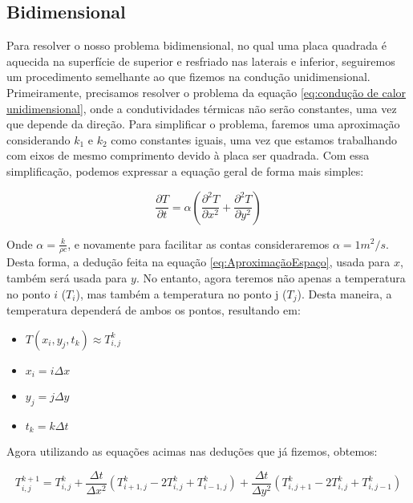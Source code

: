 \documentclass[final,5p,times,twocolumn]{elsarticle}
\begin{document}
\subsection{Bidimensional}


Para resolver o nosso problema bidimensional, no qual uma placa quadrada é aquecida na superfície de superior e resfriado nas laterais e inferior, seguiremos um procedimento semelhante ao que fizemos na condução unidimensional. Primeiramente, precisamos resolver o problema da equação \ref{eq:condução de calor unidimensional}, onde a condutividades térmicas não serão constantes, uma vez que depende da direção. Para simplificar o problema, faremos uma aproximação considerando $k_1$ e $k_2$ como constantes iguais, uma vez que estamos trabalhando com eixos de mesmo comprimento devido à placa ser quadrada. Com essa simplificação, podemos expressar a equação geral de forma mais simples:

\begin{equation*}
    \frac{\partial T}{\partial t} = \alpha(\frac{\partial^2T}{\partial x^2} +
                                          \frac{\partial^2T}{\partial y^2})
\end{equation*}

Onde $\alpha = \frac{k}{\rho c}$, e novamente para facilitar as contas consideraremos $\alpha = 1 m^2/s$. Desta forma, a dedução feita na equação \ref{eq:AproximaçãoEspaço}, usada para $x$, também será usada para $y$. No entanto, agora teremos não apenas a temperatura no ponto $i$ ($T_i$), mas também a temperatura no ponto j ($T_j$). Desta maneira, a temperatura dependerá de ambos os pontos, resultando em:

\begin{itemize}
    \item $T(x_i, y_j, t_k) \approx T_{i,j}^k$
    \item $x_i = i\Delta x$
    \item $y_j = j\Delta y$
    \item $t_k = k\Delta t$
\end{itemize}

Agora utilizando as equações acimas nas deduções que já fizemos, obtemos:

\begin{equation}
    T_{i,j}^{k+1} = T_{i,j}^k + \frac{\Delta t}{\Delta x^2}(T_{i+1,j}^k - 2T_{i,j}^k + T_{i-1,j}^k)
                              + \frac{\Delta t}{\Delta y^2}(T_{i,j+1}^k - 2T_{i,j}^k + T_{i,j-1}^k) 
\end{equation}
\end{document}
